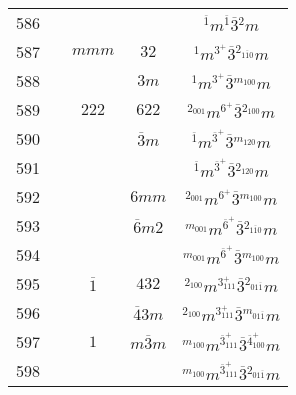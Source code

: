 \begin{longtable}{ccccc}
  586 &  &  &  & ${}^{\overline{1}} m {}^{\overline{1}} \overline{3} {}^{2} m $\\
  587 &  & $mmm$ & $32$ & ${}^{1} m {}^{3^{+}} \overline{3} {}^{2_{1\overline{1}0}} m $\\
  588 &  &  & $3m$ & ${}^{1} m {}^{3^{+}} \overline{3} {}^{m_{100}} m $\\
  589 &  & $222$ & $622$ & ${}^{2_{001}} m {}^{6^{+}} \overline{3} {}^{2_{100}} m $\\
  590 &  &  & $\overline{3}m$ & ${}^{\overline{1}} m {}^{\overline{3}^{+}} \overline{3} {}^{m_{120}} m $\\
  591 &  &  &  & ${}^{\overline{1}} m {}^{\overline{3}^{+}} \overline{3} {}^{2_{120}} m $\\
  592 &  &  & $6mm$ & ${}^{2_{001}} m {}^{6^{+}} \overline{3} {}^{m_{100}} m $\\
  593 &  &  & $\overline{6}m2$ & ${}^{m_{001}} m {}^{\overline{6}^{+}} \overline{3} {}^{2_{1\overline{1}0}} m $\\
  594 &  &  &  & ${}^{m_{001}} m {}^{\overline{6}^{+}} \overline{3} {}^{m_{100}} m $\\
  595 &  & $\overline{1}$ & $432$ & ${}^{2_{100}} m {}^{3^{+}_{111}} \overline{3} {}^{2_{01\overline{1}}} m $\\
  596 &  &  & $\overline{4}3m$ & ${}^{2_{100}} m {}^{3^{+}_{111}} \overline{3} {}^{m_{01\overline{1}}} m $\\
  597 &  & $1$ & $m\overline{3}m$ & ${}^{m_{100}} m {}^{\overline{3}^{+}_{111}} \overline{3} {}^{\overline{4}^{+}_{100}} m $\\
  598 &  &  &  & ${}^{m_{100}} m {}^{\overline{3}^{+}_{111}} \overline{3} {}^{2_{01\overline{1}}} m $\\
  \hline\hline
\end{longtable}
